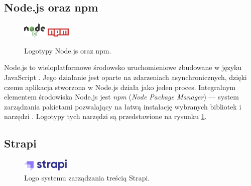 \documentclass[a4paper, 12pt, twoside]{article}
\numberwithin{figure}{section}
\begin{document}
\begin{sloppypar}

\subsection*{Node.js oraz npm}

\begin{figure}[H] 
    \centering
        \includegraphics[width=0.1\textwidth]{images/node-logo.png}\hspace{16pt}
        \includegraphics[width=0.1\textwidth]{images/npm-logo.png}
    \caption{Logotypy Node.js oraz npm.}
    \label{fig:n-logos.png}
\end{figure}

Node.js to wieloplatformowe środowsko uruchomieniowe zbudowane w języku JavaScript \cite{node}. Jego działanie jest oparte na zdarzeniach asynchronicznych, dzięki czemu aplikacja stworzona w Node.js działa jako jeden proces. Integralnym elementem środowiska Node.js jest \textit{npm} (\textit{Node Package Manager}) --- system zarządzania pakietami pozwalający na łatwą instalację wybranych bibliotek i narzędzi \cite{npm}. Logotypy tych narzędzi są przedstawione na rysunku \ref{fig:n-logos.png}.


\subsection*{Strapi}

\begin{figure}[H] 
    \centering
        \includegraphics[width=0.2\textwidth]{images/strapi-logo.png}
   \caption{Logo systemu zarządzania treścią Strapi.}
   \label{fig:strapi-logo.png}
\end{figure}


\end{sloppypar}
\end{document}
